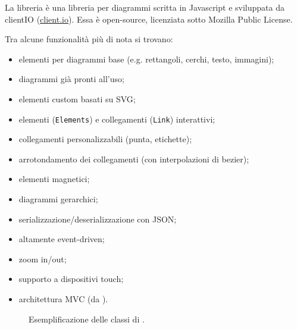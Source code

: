 La libreria \jointjs{} è una libreria per diagrammi scritta in Javascript e sviluppata da clientIO (\url{client.io}). Essa è open-source, licenziata sotto Mozilla Public License.

Tra alcune funzionalità più di nota si trovano:
\begin{itemize}
	\item elementi per diagrammi base (e.g. rettangoli, cerchi, testo, immagini);
	\item diagrammi già pronti all'uso;
	\item elementi custom basati su SVG;
	\item elementi (\texttt{Elements}) e collegamenti (\texttt{Link}) interattivi;
	\item collegamenti personalizzabili (punta, etichette);
	\item arrotondamento dei collegamenti (con interpolazioni di bezier);
	\item elementi magnetici;
	\item diagrammi gerarchici;
	\item serializzazione/deserializzazione con JSON;
	\item altamente event-driven;
	\item zoom in/out;
	\item supporto a dispositivi touch;
	\item architettura MVC (da \backbonejs).
\end{itemize}

\begin{figure}[H]
	\caption{Esemplificazione delle classi di \jointjs.}
\end{figure}


